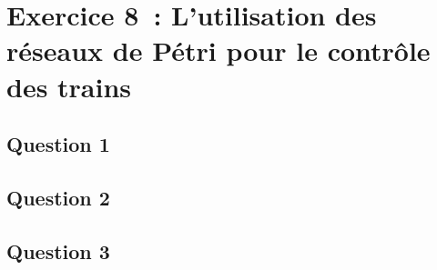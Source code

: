 \section*{Exercice 8~: L'utilisation des réseaux de Pétri pour le
  contrôle des trains}

\subsection*{Question 1}

\subsection*{Question 2}

\subsection*{Question 3}
